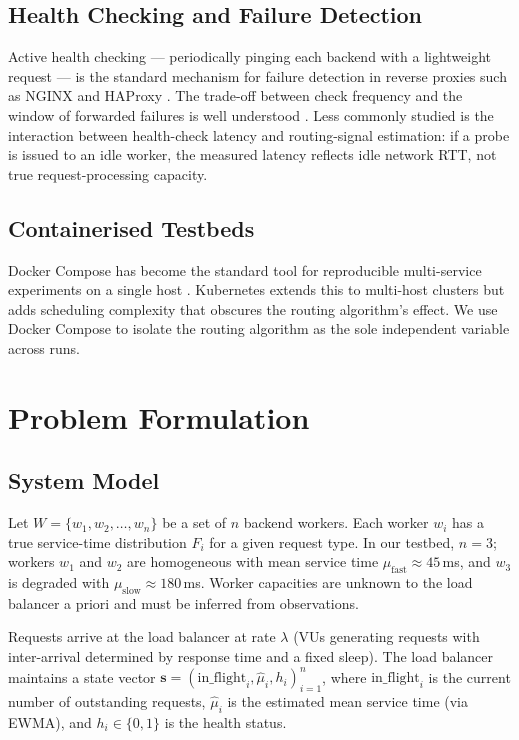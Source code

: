 \documentclass[conference]{IEEEtran}
\begin{document}
\subsection{Health Checking and Failure Detection}

Active health checking --- periodically pinging each backend with a
lightweight request --- is the standard mechanism for failure detection
in reverse proxies such as NGINX \cite{nginx} and HAProxy \cite{haproxy}.
The trade-off between check frequency and the window of forwarded
failures is well understood \cite{tanenbaum}. Less commonly studied is
the interaction between health-check latency and routing-signal
estimation: if a probe is issued to an idle worker, the measured latency
reflects idle network RTT, not true request-processing capacity.

\subsection{Containerised Testbeds}

Docker Compose has become the standard tool for reproducible multi-service
experiments on a single host \cite{docker}. Kubernetes \cite{kubernetes}
extends this to multi-host clusters but adds scheduling complexity that
obscures the routing algorithm's effect. We use Docker Compose to isolate
the routing algorithm as the sole independent variable across runs.

\section{Problem Formulation}

\subsection{System Model}

Let $W = \{w_1, w_2, \ldots, w_n\}$ be a set of $n$ backend workers.
Each worker $w_i$ has a true service-time distribution $F_i$ for a given
request type. In our testbed, $n=3$; workers $w_1$ and $w_2$ are
homogeneous with mean service time $\mu_{\text{fast}} \approx 45$\,ms,
and $w_3$ is degraded with $\mu_{\text{slow}} \approx 180$\,ms. Worker
capacities are unknown to the load balancer a priori and must be
inferred from observations.

Requests arrive at the load balancer at rate $\lambda$ (VUs generating
requests with inter-arrival determined by response time and a fixed
sleep). The load balancer maintains a state vector
$\mathbf{s} = (\text{in\_flight}_i, \hat{\mu}_i, h_i)_{i=1}^{n}$,
where $\text{in\_flight}_i$ is the current number of outstanding
requests, $\hat{\mu}_i$ is the estimated mean service time (via EWMA),
and $h_i \in \{0,1\}$ is the health status.
\end{document}
